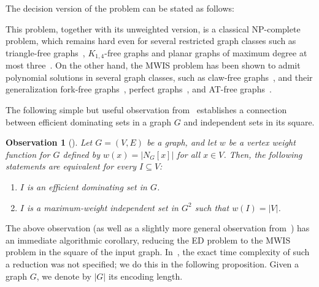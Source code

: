 \documentclass[]{elsarticle}
\newcommand{\NP}{\textsf{NP}}
\newtheorem{observation}[theorem]{Observation}
\def\mwis{{\sc{MWIS }}}
\begin{document}
The decision version of the \mwis problem can be stated as follows:

\medskip
\begin{center}
\end{center}
\medskip

This problem, together with its unweighted version, is a classical \NP-complete problem, which remains hard even for several restricted graph classes such as triangle-free graphs~\cite{Pol74}, $K_{1,4}$-free graphs \cite{Min80} and planar graphs of maximum degree at most three~\cite{GJ77}.
On the other hand, the MWIS problem has been shown to admit polynomial solutions in several graph classes, such as claw-free graphs~\cite{Min80,NT01,OPS08}, and their generalization fork-free graphs~\cite{LM08}, perfect graphs~\cite{GLS84}, and AT-free graphs~\cite{BKM99}.

The following simple but useful observation from~\cite{BLR} establishes a connection between efficient dominating sets in a graph $G$ and independent sets in its square.

\begin{observation}[\cite{BLR}]\label{lem:eds-wis}
Let $G=(V,E)$ be a graph, and let $w$ be a vertex weight function for $G$ defined by $w(x) = |N_G[x]|$ for all $x\in V$. 
Then, the following statements are equivalent for every $I\subseteq V$:
\begin{enumerate}
  \item[(i)] $I$ is an efficient dominating set in $G$.
  \item[(ii)] $I$ is a maximum-weight independent set in $G^2$ such that $w(I) = |V|$.
\end{enumerate}
\end{observation}

The above observation (as well as a slightly more general observation from~\cite{Milanic}) has an immediate algorithmic corollary, reducing the ED problem to the MWIS problem in the square of the input graph. 
In~\cite{BLR,Milanic}, the exact time complexity of such a reduction was not specified; we do this in the following proposition.
Given a graph $G$, we denote by $|G|$ its encoding length.
\end{document}
